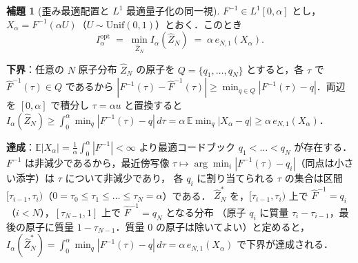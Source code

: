 \documentclass[a4paper,10pt]{jsarticle}
\makeatletter
\theoremstyle{definition}
\newtheorem{lemma}{補題}[section]
\renewenvironment{proof}[1][\proofname]{\par
  \pushQED{\qed}%
  \normalfont \topsep6\p@\@plus6\p@\relax
  \trivlist
  \item[\hskip\labelsep\textbf{#1}]\ignorespaces
}{%
  \popQED\endtrivlist\@endpefalse
}
\renewcommand{\proofname}{証明}
\newcommand{\Finv}{F^{-1}}
\newcommand{\Fhinv}{\hat{F}^{-1}}
\newcommand{\E}{\mathbb{E}}
\newcommand{\eN}{e_{N,1}}
\newcommand{\Iopt}{I_\alpha^{\mathrm{opt}}}
\makeatother
\begin{document}
\begin{lemma}[歪み最適配置と $L^1$ 最適量子化の同一視]
\label{lem:identify}
$\Finv\in L^1[0,\alpha]$ とし，$X_\alpha=\Finv(\alpha U)$（$U\sim\mathrm{Unif}(0,1)$）とおく．このとき
\begin{equation}
  \Iopt\;=\;\min_{\hat Z_N}I_\alpha(\hat Z_N)\;=\;\alpha\,\eN(X_\alpha).
  \label{eq:identify}
\end{equation}
\end{lemma}
\begin{proof}
\textbf{下界}：任意の $N$ 原子分布 $\hat Z_N$ の原子を $Q=\{q_1,\dots,q_N\}$ とすると，各 $\tau$ で $\Fhinv(\tau)\in Q$ であるから
$|\Finv(\tau)-\Fhinv(\tau)|\ge\min_{q\in Q}|\Finv(\tau)-q|$．両辺を $[0,\alpha]$ で積分し $\tau=\alpha u$ と置換すると
$I_\alpha(\hat Z_N)\ge\int_0^\alpha\min_{q}|\Finv(\tau)-q|\,d\tau=\alpha\,\E\min_q|X_\alpha-q|\ge\alpha\,\eN(X_\alpha)$．

\textbf{達成}：$\E|X_\alpha|=\frac1\alpha\int_0^\alpha|\Finv|<\infty$ より最適コードブック $q_1<\dots<q_N$ が存在する．
$\Finv$ は非減少であるから，最近傍写像 $\tau\mapsto\arg\min_i|\Finv(\tau)-q_i|$（同点は小さい添字）は $\tau$ について非減少であり，
各 $q_i$ に割り当てられる $\tau$ の集合は区間 $[\tau_{i-1},\tau_i)$（$0=\tau_0\le\tau_1\le\dots\le\tau_N=\alpha$）である．
$\hat Z_N^\ast$ を，$[\tau_{i-1},\tau_i)$ 上で $\Fhinv=q_i$（$i<N$），$[\tau_{N-1},1]$ 上で $\Fhinv=q_N$ となる分布
（原子 $q_i$ に質量 $\tau_i-\tau_{i-1}$，最後の原子に質量 $1-\tau_{N-1}$．質量 $0$ の原子は除いてよい）と定めると，
$I_\alpha(\hat Z_N^\ast)=\int_0^\alpha\min_q|\Finv(\tau)-q|\,d\tau=\alpha\,\eN(X_\alpha)$ で下界が達成される．
\end{proof}
\end{document}
